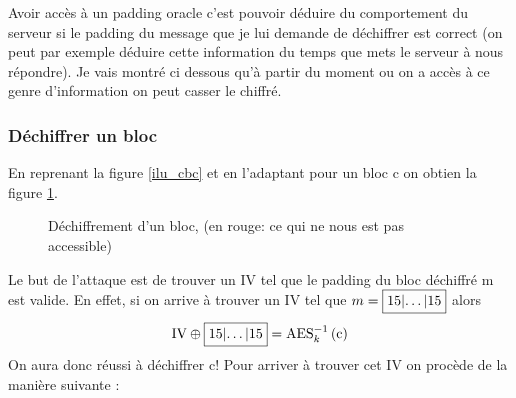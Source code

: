 \documentclass[a4paper, 12pt]{article}
\begin{document}
Avoir accès à un padding oracle c'est pouvoir déduire du comportement du serveur si le padding du message que je lui demande de déchiffrer est correct (on peut par exemple déduire cette information du temps que mets le serveur à nous répondre).
Je vais montré ci dessous qu'à partir du moment ou on a accès à ce genre d'information on peut casser le chiffré.

\subsubsection{Déchiffrer un bloc}
En reprenant la figure \ref{ilu_cbc} et en l'adaptant pour un bloc c on obtien la figure \ref{cbcdec1bloc}. 

\begin{figure}[h]
\centering
{}
\caption{Déchiffrement d'un bloc, (en rouge: ce qui ne nous est pas accessible)}
\label{cbcdec1bloc}
\end{figure}

Le but de l'attaque est de trouver un IV tel que le padding du bloc déchiffré m est valide. En effet, si on arrive à trouver un IV tel que $m = \fbox{15|\dots|15}$ alors 
$$ 
\text{IV} \oplus \fbox{15|\dots|15} = \text{AES}^{-1}_{k}\left(\text{c}\right)
$$
On aura donc réussi à déchiffrer c! Pour arriver à trouver cet IV on procède de la manière suivante : \\
\end{document}
